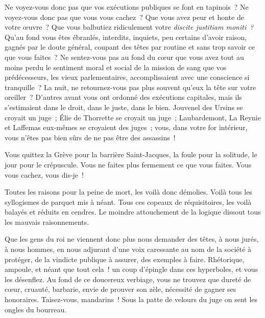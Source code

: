\documentclass[french,twoside]{book} %
\begin{document}
Ne voyez-vous donc pas que vos exécutions publiques se font en tapinois ? Ne voyez-vous donc pas que vous vous cachez ? Que vous avez peur et honte de votre œuvre ? Que vous balbutiez ridiculement votre \emph{discite justitiam moniti ?} Qu’au fond vous êtes ébranlés, interdits, inquiets, peu certains d’avoir raison, gagnés par le doute général, coupant  des têtes par routine et sans trop savoir ce que vous faites ? Ne sentez-vous pas au fond du cœur que vous avez tout au moins perdu le sentiment moral et social de la mission de sang que vos prédécesseurs, les vieux parlementaires, accomplissaient avec une conscience si tranquille ? La nuit, ne retournez-vous pas plus souvent qu’eux la tête sur votre oreiller ? D’autres avant vous ont ordonné des exécutions capitales, mais ils s’estimaient dans le droit, dans le juste, dans le bien. Jouvenel des Ursins se croyait un juge ; Élie de Thorrette se croyait un juge ; Laubardemont, La Reynie et Laffemas eux-mêmes se croyaient des juges ; vous, dans votre for intérieur, vous n’êtes pas bien sûrs de ne pas être des assassins !\par
Vous quittez la Grève pour la barrière Saint-Jacques, la foule pour la solitude, le jour pour le crépuscule. Vous ne faites plus fermement ce que vous faites. Vous vous cachez, vous dis-je !\par
Toutes les raisons pour la peine de mort, les voilà donc démolies. Voilà tous les syllogismes de parquet mis à néant. Tous ces copeaux de réquisitoires, les voilà balayés et réduits en cendres. Le moindre attouchement de la logique dissout tous les mauvais raisonnements.\par
Que les gens du roi ne viennent donc plus nous demander des têtes, à nous jurés, à nous hommes, en nous adjurant d’une voix caressante au nom de la société à protéger, de la vindicte publique à assurer, des exemples à faire. Rhétorique, ampoule, et néant que tout cela ! un coup d’épingle dans ces hyperboles, et vous les désenflez. Au fond de ce doucereux verbiage, vous ne trouvez que dureté de cœur, cruauté, barbarie, envie de prouver son zèle, nécessité de  gagner ses honoraires. Taisez-vous, mandarins ! Sous la patte de velours du juge on sent les ongles du bourreau.\par
\end{document}
